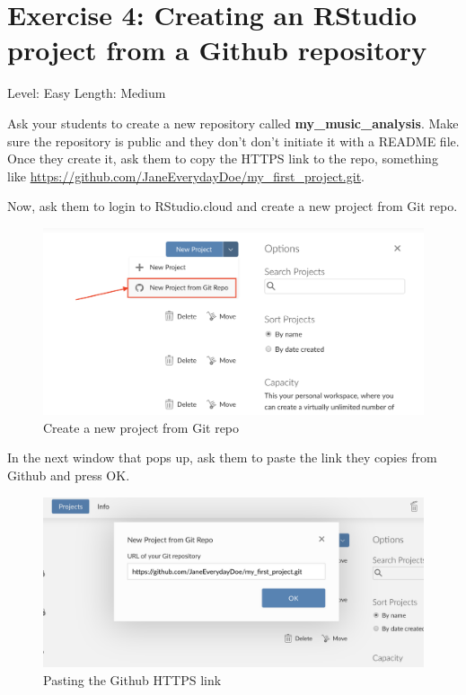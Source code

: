 \documentclass[]{book}
\begin{document}
\hypertarget{exercise-4-creating-an-rstudio-project-from-a-github-repository}{%
\section*{Exercise 4: Creating an RStudio project from a Github repository}\label{exercise-4-creating-an-rstudio-project-from-a-github-repository}}

Level: Easy
Length: Medium

Ask your students to create a new repository called \textbf{my\_music\_analysis}. Make sure the repository is public and they don't don't initiate it with a README file. Once they create it, ask them to copy the HTTPS link to the repo, something like \url{https://github.com/JaneEverydayDoe/my_first_project.git}.

Now, ask them to login to RStudio.cloud and create a new project from Git repo.

\begin{figure}
\centering
\includegraphics{./images/new_rstudio_from_git.png}
\caption{Create a new project from Git repo}
\end{figure}

In the next window that pops up, ask them to paste the link they copies from Github and press OK.

\begin{figure}
\centering
\includegraphics{./images/paste_github_link.png}
\caption{Pasting the Github HTTPS link}
\end{figure}
\end{document}
